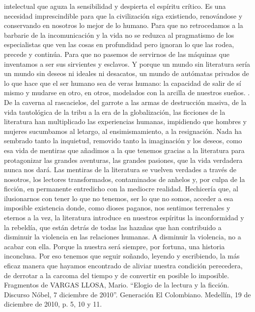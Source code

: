 \documentclass[a4paper,12pt]{article}\usepackage[spanish]{babel}\usepackage{times}
\begin{document}
intelectual que aguza la sensibilidad y despierta el espíritu crítico. Es una necesidad imprescindible para que la civilización siga existiendo, renovándose y conservando en nosotros lo mejor de lo humano. Para que no retrocedamos a la barbarie de la incomunicación y la vida no se reduzca al pragmatismo de los especialistas que ven las cosas en profundidad pero ignoran lo que las rodea, precede y continúa. Para que no pasemos de servirnos de las máquinas que inventamos a ser sus sirvientes y esclavos. Y porque un mundo sin literatura sería un mundo sin deseos ni ideales ni desacatos, un mundo de autómatas privados de lo que hace que el ser humano sea de veras humano: la capacidad de salir de sí mismo y mudarse en otro, en otros, modelados con la arcilla de nuestros sueños. . De la caverna al rascacielos, del garrote a las armas de destrucción masiva, de la vida tautológica de la tribu a la era de la globalización, las ficciones de la literatura han multiplicado las experiencias humanas, impidiendo que hombres y mujeres sucumbamos al letargo, al ensimismamiento, a la resignación. Nada ha sembrado tanto la inquietud, removido tanto la imaginación y los deseos, como esa vida de mentiras que añadimos a la que tenemos gracias a la literatura para protagonizar las grandes aventuras, las grandes pasiones, que la vida verdadera nunca nos dará. Las mentiras de la literatura se vuelven verdades a través de nosotros, los lectores transformados, contaminados de anhelos y, por culpa de la ficción, en permanente entredicho con la mediocre realidad. Hechicería que, al ilusionarnos con tener lo que no tenemos, ser lo que no somos, acceder a esa imposible existencia donde, como dioses paganos, nos sentimos terrenales y eternos a la vez, la literatura introduce en nuestros espíritus la inconformidad y la rebeldía, que están detrás de todas las hazañas que han contribuido a disminuir la violencia en las relaciones humanas. A disminuir la violencia, no a acabar con ella. Porque la nuestra será siempre, por fortuna, una historia inconclusa. Por eso tenemos que seguir soñando, leyendo y escribiendo, la más eficaz manera que hayamos encontrado de aliviar nuestra condición perecedera, de derrotar a la carcoma del tiempo y de convertir en posible lo imposible. \newline Fragmentos de VARGAS LLOSA, Mario. “Elogio de la lectura y la ficción. Discurso Nóbel, 7 diciembre de 2010”. Generación  El Colombiano. Medellín, 19 de diciembre de 2010, p. 5, 10 y 11.
\end{document}
